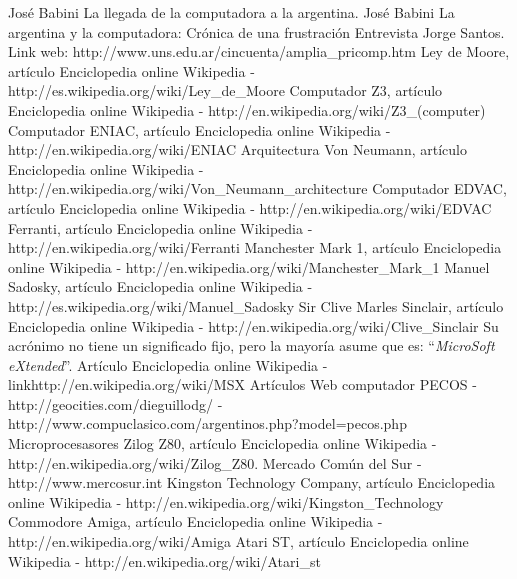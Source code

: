 \documentclass[%
 	final,
%
	notitlepage,
	narroweqnarray,
	inline,
 	twoside,
	]{ieee}
\newcommand{\link}[1]{\textit{}{#1}}
\begin{document}
\begin{thebibliography}{1}

 Jos\'e Babini La llegada de la computadora a la argentina.
 Jos\'e Babini La argentina y la computadora: Cr\'onica de una frustraci\'on
 Entrevista Jorge Santos.
 Link web: \link{http://www.uns.edu.ar/cincuenta/amplia\_pricomp.htm}
 Ley de Moore, art\'iculo Enciclopedia online Wikipedia -\link{http://es.wikipedia.org/wiki/Ley\_de\_Moore}
 Computador Z3, art\'iculo Enciclopedia online Wikipedia - \link{http://en.wikipedia.org/wiki/Z3\_(computer)}
 Computador ENIAC, art\'iculo Enciclopedia online Wikipedia - \link{http://en.wikipedia.org/wiki/ENIAC}
 Arquitectura Von Neumann, art\'iculo Enciclopedia online Wikipedia - \link{http://en.wikipedia.org/wiki/Von\_Neumann\_architecture}
 Computador EDVAC, art\'iculo Enciclopedia online Wikipedia - \link{http://en.wikipedia.org/wiki/EDVAC}
 Ferranti, art\'iculo Enciclopedia online Wikipedia - \link{http://en.wikipedia.org/wiki/Ferranti}
 Manchester Mark 1, art\'iculo Enciclopedia online Wikipedia - \link{http://en.wikipedia.org/wiki/Manchester\_Mark\_1}
 Manuel Sadosky, art\'iculo Enciclopedia online Wikipedia - \link{http://es.wikipedia.org/wiki/Manuel\_Sadosky}
 Sir Clive Marles Sinclair, art\'iculo Enciclopedia online Wikipedia - \link{http://en.wikipedia.org/wiki/Clive\_Sinclair}
 Su acr\'onimo no tiene un significado fijo, pero la mayor\'ia asume que es: ``\textit{MicroSoft eXtended}''. Art\'iculo Enciclopedia online Wikipedia - link{http://en.wikipedia.org/wiki/MSX}
 Art\'iculos Web computador PECOS - \link{http://geocities.com/dieguillodg/} - \link{http://www.compuclasico.com/argentinos.php?model=pecos.php}
 Microprocesasores Zilog Z80, art\'iculo Enciclopedia online Wikipedia - \link{http://en.wikipedia.org/wiki/Zilog\_Z80}.
 Mercado Com\'un del Sur - \link{http://www.mercosur.int}
 Kingston Technology Company, art\'iculo Enciclopedia online Wikipedia - \link{http://en.wikipedia.org/wiki/Kingston\_Technology}
 Commodore Amiga, art\'iculo Enciclopedia online Wikipedia - \link{http://en.wikipedia.org/wiki/Amiga}
 Atari ST, art\'iculo Enciclopedia online Wikipedia - \link{http://en.wikipedia.org/wiki/Atari\_st}

\end{thebibliography}
\end{document}

